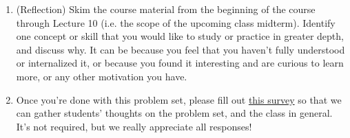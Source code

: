 \documentclass[11pt]{article}
\begin{document}
\begin{enumerate}
\begin{enumerate}
\item (Age Lookups)
For privacy reasons, the Bureau decides to not publish any statistics on the population ages, but just wants to maintain a database where the age of any member of the population can be looked up quickly, and the database can be quickly updated daily according to births, deaths, and immigration.







 \item (Daily Quartiles, optional\footnote{This problem won't make a difference between N, L, R-, and R grades.}) The Bureau receives a daily list of updates and publish the 25th, 50th, and 75th percentile of population ages, similar to (b). This time, however, when an update deletes someone's data (i.e. death, emigration), the Bureau only receives their $\id$. Incoming data (i.e. birth, immigration) is still in the format $(\id, \bday)$.











 \end{enumerate}

 \item (Reflection) Skim the course material from the beginning of the course through Lecture 10 (i.e. the scope of the upcoming class midterm).  Identify one concept or skill that you would like to study or practice in greater depth, and discuss why.  It can be because you feel that you haven't fully understood or internalized it, or because you found it interesting and are curious to learn more, or any other motivation you have. 

 \item Once you're done with this problem set, please fill out \href{https://forms.gle/rqNCLevdNnneKvV16}{this survey} so that we can gather students' thoughts on the problem set, and the class in general. It's not required, but we really appreciate all responses!


    
\end{enumerate}    
 
\end{document}
